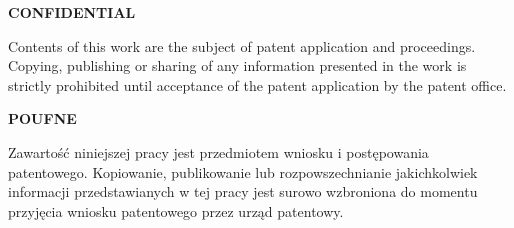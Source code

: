 \textbf{\huge CONFIDENTIAL}

    Contents of this work are the subject of patent application and proceedings. Copying, publishing or sharing of any information presented in the work is strictly prohibited until acceptance of the patent application by the patent office.

\vskip 3cm 
\textbf{\huge POUFNE}

    Zawartość niniejszej pracy jest przedmiotem wniosku i postępowania patentowego. Kopiowanie, publikowanie lub rozpowszechnianie jakichkolwiek informacji przedstawianych w tej pracy jest surowo wzbroniona do momentu przyjęcia wniosku patentowego przez urząd patentowy.
